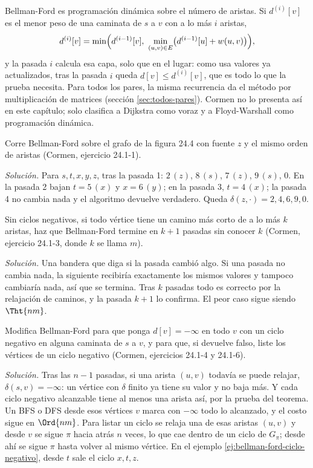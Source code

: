 \documentclass[11pt,letterpaper]{article}
\begin{document}
\begin{observacion}
  Bellman-Ford es programación dinámica sobre el número de aristas.
  Si $d^{(i)}[v]$ es el menor peso de una caminata de $s$ a $v$ con a
  lo más $i$ aristas,
  \[
    d^{(i)}[v] = \min\Bigl(d^{(i-1)}[v],\
      \min_{(u, v) \in E} \bigl(d^{(i-1)}[u] + w(u, v)\bigr)\Bigr) ,
  \]
  y la pasada $i$ calcula esa capa, solo que en el lugar: como usa
  valores ya actualizados, tras la pasada $i$ queda
  $d[v] \le d^{(i)}[v]$, que es todo lo que la prueba necesita. Para
  todos los pares, la misma recurrencia da el método por
  multiplicación de matrices (sección \ref{sec:todos-pares}). Cormen
  no lo presenta así en este capítulo; solo clasifica a Dijkstra como
  voraz y a Floyd-Warshall como programación dinámica.
\end{observacion}

\begin{ejercicio}
  Corre Bellman-Ford sobre el grafo de la figura 24.4 con fuente $z$ y
  el mismo orden de aristas (Cormen, ejercicio 24.1-1).

  \textit{Solución.} Para $s, t, x, y, z$, tras la pasada 1:
  $2\,(z)$, $8\,(s)$, $7\,(z)$, $9\,(s)$, $0$. En la pasada 2 bajan
  $t = 5\,(x)$ y $x = 6\,(y)$; en la pasada 3, $t = 4\,(x)$; la pasada
  4 no cambia nada y el algoritmo devuelve verdadero. Queda
  $\delta(z, \cdot) = 2, 4, 6, 9, 0$.
\end{ejercicio}

\begin{ejercicio}
  Sin ciclos negativos, si todo vértice tiene un camino más corto de a
  lo más $k$ aristas, haz que Bellman-Ford termine en $k + 1$ pasadas
  sin conocer $k$ (Cormen, ejercicio 24.1-3, donde $k$ se llama $m$).

  \textit{Solución.} Una bandera que diga si la pasada cambió algo.
  Si una pasada no cambia nada, la siguiente recibiría exactamente los
  mismos valores y tampoco cambiaría nada, así que se termina. Tras
  $k$ pasadas todo es correcto por la relajación de caminos, y la
  pasada $k + 1$ lo confirma. El peor caso sigue siendo $\Tht{nm}$.
\end{ejercicio}

\begin{ejercicio}
  Modifica Bellman-Ford para que ponga $d[v] = -\infty$ en todo $v$
  con un ciclo negativo en alguna caminata de $s$ a $v$, y para que,
  si devuelve falso, liste los vértices de un ciclo negativo (Cormen,
  ejercicios 24.1-4 y 24.1-6).

  \textit{Solución.} Tras las $n - 1$ pasadas, si una arista $(u, v)$
  todavía se puede relajar, $\delta(s, v) = -\infty$: un vértice con
  $\delta$ finito ya tiene su valor y no baja más. Y cada ciclo
  negativo alcanzable tiene al menos una arista así, por la prueba
  del teorema. Un BFS o DFS desde esos vértices $v$ marca con
  $-\infty$ todo lo alcanzado, y el costo sigue en $\Ord{nm}$. Para
  listar un ciclo se relaja una de esas aristas $(u, v)$ y desde $v$
  se sigue $\pi$ hacia atrás $n$ veces, lo que cae dentro de un ciclo
  de $G_\pi$; desde ahí se sigue $\pi$ hasta volver al mismo vértice.
  En el ejemplo \ref{ej:bellman-ford-ciclo-negativo}, desde $t$ sale
  el ciclo $x, t, z$.
\end{ejercicio}
\end{document}
